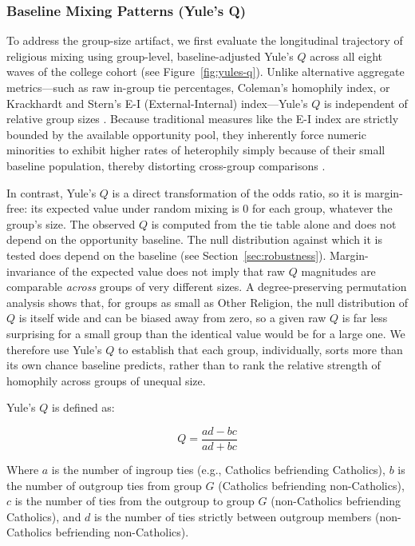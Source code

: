 \documentclass[11pt]{article}
\begin{document}
\subsubsection{Baseline Mixing Patterns (Yule's Q)}

To address the group-size artifact, we first evaluate the longitudinal trajectory of religious mixing using group-level, baseline-adjusted Yule's $Q$ across all eight waves of the college cohort (see Figure~\ref{fig:yules-q}). Unlike alternative aggregate metrics---such as raw in-group tie percentages, Coleman's homophily index, or Krackhardt and Stern's E-I (External-Internal) index---Yule's $Q$ is independent of relative group sizes \citep[159]{borgatti2024analyzing}. Because traditional measures like the E-I index are strictly bounded by the available opportunity pool, they inherently force numeric minorities to exhibit higher rates of heterophily simply because of their small baseline population, thereby distorting cross-group comparisons \citep[for a review mapping segregation measures to theoretical properties, see][]{bojanowski2014}. 

In contrast, Yule's $Q$ is a direct transformation of the odds ratio, so it is margin-free: its expected value under random mixing is $0$ for each group, whatever the group's size. The observed $Q$ is computed from the tie table alone and does not depend on the opportunity baseline. The null distribution against which it is tested does depend on the baseline (see Section~\ref{sec:robustness}). Margin-invariance of the expected value does not imply that raw $Q$ magnitudes are comparable \textit{across} groups of very different sizes. A degree-preserving permutation analysis shows that, for groups as small as Other Religion, the null distribution of $Q$ is itself wide and can be biased away from zero, so a given raw $Q$ is far less surprising for a small group than the identical value would be for a large one. We therefore use Yule's $Q$ to establish that each group, individually, sorts more than its own chance baseline predicts, rather than to rank the relative strength of homophily across groups of unequal size.

Yule's $Q$ is defined as:

\begin{equation}
Q = \frac{ad - bc}{ad + bc}
\end{equation}

Where $a$ is the number of ingroup ties (e.g., Catholics befriending Catholics), $b$ is the number of outgroup ties from group $G$ (Catholics befriending non-Catholics), $c$ is the number of ties from the outgroup to group $G$ (non-Catholics befriending Catholics), and $d$ is the number of ties strictly between outgroup members (non-Catholics befriending non-Catholics). 
\end{document}
